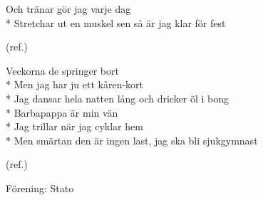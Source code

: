 \begin{SongText}[Sjukgymnastlåten]
\begin{SongVerse}
        Och tränar gör jag varje dag\\*%
        Stretchar ut en muskel sen så är jag klar för fest
    \end{SongVerse}
    \begin{SongVerse}
        (ref.)
    \end{SongVerse}
    \begin{SongVerse}
        Veckorna de springer bort\\*%
        Men jag har ju ett kåren-kort\\*%
        Jag dansar hela natten lång och dricker öl i bong\\*%
        Barbapappa är min vän\\*%
        Jag trillar när jag cyklar hem\\*%
        Men smärtan den är ingen last, jag ska bli sjukgymnast
    \end{SongVerse}
    \begin{SongVerse}
        (ref.)
    \end{SongVerse}
\end{SongText}

\begin{SongText}[???]
    \begin{SongInfo}
        Förening: Stato
    \end{SongInfo}
    \begin{SongVerse}
        [NO SONG]
    \end{SongVerse}
\end{SongText}


